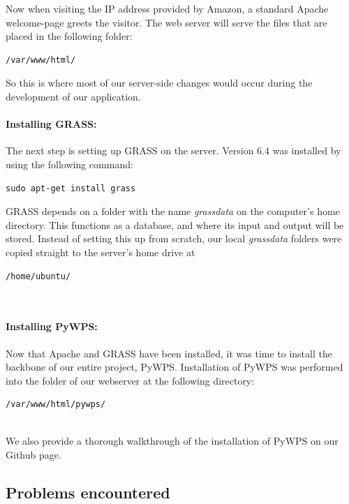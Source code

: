 Now when visiting the IP address provided by Amazon, a standard Apache welcome-page greets the visitor.
The web server will serve the files that are placed in the following folder:

\begin{lstlisting}
/var/www/html/
\end{lstlisting}

So this is where most of our server-side changes would occur during the development of our application.\\

\paragraph{Installing GRASS:} The next step is setting up GRASS on the server. Version 6.4 was installed by using the following command:

\begin{lstlisting}
sudo apt-get install grass
\end{lstlisting}

GRASS depends on a folder with the name \textit{grassdata} on the computer's home directory. This functions as a database, and where its input and output will be stored. Instead of setting this up from scratch, our local \textit{grassdata} folders were copied straight to the server's home drive at

\begin{lstlisting} 
/home/ubuntu/
\end{lstlisting}\\

\paragraph{Installing PyWPS:} Now that Apache and GRASS have been installed, it was time to install the backbone of our entire project, PyWPS.
Installation of PyWPS was performed into the folder of our webserver at the following directory:

\begin{lstlisting}
/var/www/html/pywps/
\end{lstlisting}\\

We also provide a thorough walkthrough of the installation of PyWPS on our Github page.

\subsection{Problems encountered}\\

